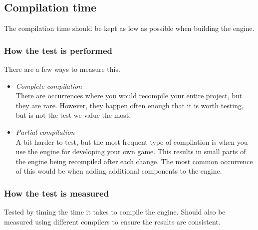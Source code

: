 \subsection{Compilation time}
The compilation time should be kept as low as possible when building the engine.


\subsubsection*{How the test is performed}
There are a few ways to measure this.

\begin{itemize}

    \item \noindent\textit{Complete compilation}\\
    There are occurrences where you would recompile your entire project, but they are rare.
    However, they happen often enough that it is worth testing, but is not the test we value the most.

    \item \noindent\textit{Partial compilation}\\
    A bit harder to test, but the most frequent type of compilation is when you use the engine for developing your own game.
    This results in small parts of the engine being recompiled after each change.
    The most common occurrence of this would be when adding additional components to the engine.

\end{itemize}

\subsubsection*{How the test is measured}
Tested by timing the time it takes to compile the engine. Should also be measured using different compilers to ensure the results are consistent.